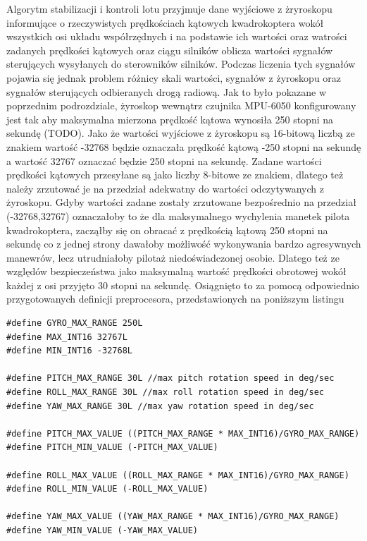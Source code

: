 Algorytm stabilizacji i kontroli lotu przyjmuje dane wyjściowe z żryroskopu informujące o rzeczywistych prędkościach kątowych kwadrokoptera wokół wszystkich osi układu współrzędnych i na podstawie ich wartości oraz watrości zadanych prędkości kątowych oraz ciągu silników oblicza wartości sygnałów sterujących wysyłanych do sterowników silników. Podczas liczenia tych sygnałów pojawia się jednak problem różnicy skali wartości, sygnałów z żyroskopu oraz sygnałów sterujących odbieranych drogą radiową. Jak to było pokazane w poprzednim podrozdziale, żyroskop wewnątrz czujnika MPU-6050 konfigurowany jest tak aby maksymalna mierzona prędkość kątowa wynosiła 250 stopni na sekundę (TODO). Jako że wartości wyjściowe z żyroskopu są 16-bitową liczbą ze znakiem wartość -32768 będzie oznaczała prędkość kątową -250 stopni na sekundę a wartość 32767 oznaczać będzie 250 stopni na sekundę. Zadane wartości prędkości kątowych przesyłane są jako liczby 8-bitowe ze znakiem, dlatego też należy zrzutować je na przedział adekwatny do wartości odczytywanych z żyroskopu. Gdyby wartości zadane zostały zrzutowane bezpośrednio na przedział (-32768,32767) oznaczałoby to że dla maksymalnego wychylenia manetek pilota kwadrokoptera, zacząłby się on obracać z prędkością kątową 250 stopni na sekundę co z jednej strony dawałoby możliwość wykonywania bardzo agresywnych manewrów, lecz utrudniałoby pilotaż niedoświadczonej osobie. Dlatego też ze względów bezpieczeństwa jako maksymalną wartość prędkości obrotowej wokół każdej z osi przyjęto 30 stopni na sekundę. Osiągnięto to za pomocą odpowiednio przygotowanych definicji preprocesora, przedstawionych na poniższym listingu

\begin{lstlisting}
#define GYRO_MAX_RANGE 250L
#define MAX_INT16 32767L
#define MIN_INT16 -32768L

#define PITCH_MAX_RANGE 30L //max pitch rotation speed in deg/sec
#define ROLL_MAX_RANGE 30L //max roll rotation speed in deg/sec
#define YAW_MAX_RANGE 30L //max yaw rotation speed in deg/sec

#define PITCH_MAX_VALUE ((PITCH_MAX_RANGE * MAX_INT16)/GYRO_MAX_RANGE)
#define PITCH_MIN_VALUE (-PITCH_MAX_VALUE)

#define ROLL_MAX_VALUE ((ROLL_MAX_RANGE * MAX_INT16)/GYRO_MAX_RANGE)
#define ROLL_MIN_VALUE (-ROLL_MAX_VALUE)

#define YAW_MAX_VALUE ((YAW_MAX_RANGE * MAX_INT16)/GYRO_MAX_RANGE)
#define YAW_MIN_VALUE (-YAW_MAX_VALUE)
\end{lstlisting}

